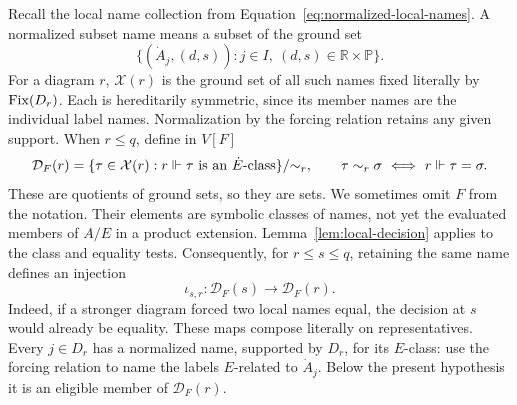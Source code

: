 Recall the local name collection from
Equation~\eqref{eq:normalized-local-names}. A normalized subset name
means a subset of the ground set
\[
 \{(\dot A_j,(d,s)):j\in I,
                 \ (d,s)\in\mathbb R\times\mathbb P\}.
\]
For a diagram $r$, $\mathcal X(r)$ is the ground set of all such
names fixed literally by $\operatorname{Fix}(D_r)$. Each is hereditarily symmetric,
since its member names are the individual label names. Normalization by
the forcing relation retains any given support. When $r\le q$, define
in $V[F]$
\[
 \mathcal D_F(r)=
 \{\tau\in\mathcal X(r):
       r\Vdash\tau\text{ is an }\dot E\text{-class}\}/\mathord\sim_r,
 \qquad
 \tau\sim_r\sigma\ \Longleftrightarrow\ r\Vdash\tau=\sigma.
\]
These are quotients of ground sets, so they are sets. We sometimes omit
$F$ from the notation. Their elements are symbolic classes of names,
not yet the evaluated members of $A/E$ in a product extension.
Lemma~\ref{lem:local-decision} applies to the
class and equality tests. Consequently, for $r\le s\le q$, retaining
the same name defines an injection
\begin{equation}\label{eq:symbolic-inclusion}
 \iota_{s,r}:\mathcal D_F(s)\longrightarrow\mathcal D_F(r).
\end{equation}
Indeed, if a stronger diagram forced two local names equal, the decision
at $s$ would already be equality. These maps compose literally on
representatives. Every $j\in D_r$ has a normalized name, supported by
$D_r$, for its $E$-class: use the forcing relation to name the labels
$E$-related to $\dot A_j$. Below the present hypothesis it is an
eligible member of $\mathcal D_F(r)$.

